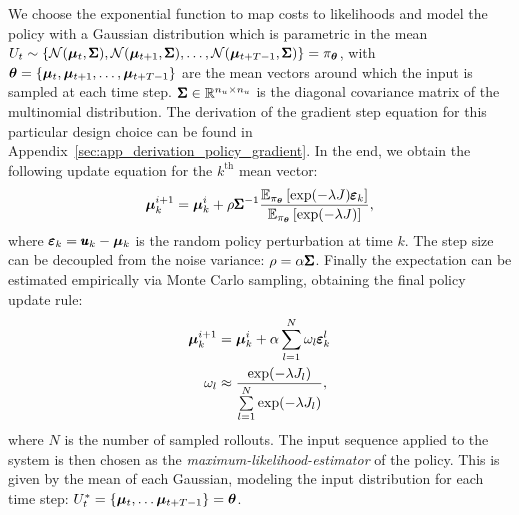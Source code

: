 We choose the exponential function to map costs to likelihoods and model the policy with a Gaussian distribution which is parametric in the mean $U_t \sim \{\mathcal{N}(\boldsymbol{\mu}_t, \pmb{\Sigma}), \mathcal{N}(\boldsymbol{\mu}_{t+1}, \pmb{\Sigma}), \dots, \mathcal{N}(\boldsymbol{\mu}_{t+T-1}, \pmb{\Sigma})\} = \pi_{\boldsymbol{\theta}}$, with $\boldsymbol{\theta} =  \{\boldsymbol{\mu}_t, \boldsymbol{\mu}_{t+1}, \dots, \boldsymbol{\mu}_{t+T-1}\}$ are the mean vectors around which the input is sampled at each time step. $\pmb{\Sigma} \in \mathbb{R}^{n_u \times n_u}$ is the diagonal covariance matrix of the multinomial distribution. The derivation of the gradient step equation for this particular design choice can be found in Appendix~\ref{sec:app_derivation_policy_gradient}. In the end, we obtain the following update equation for the $k^{\text{th}}$ mean vector:
\begin{equation}
    \boldsymbol{\mu}^{i+1}_{k} = \boldsymbol{\mu}^{i}_{k} +  \rho \pmb{\Sigma}^{-1} \frac{\mathbb{E}_{\pi_{\boldsymbol{\theta}}} \left [\exp( -\lambda J) \pmb{\varepsilon}_k \right]}{\mathbb{E}_{\pi_{\boldsymbol{\theta}}} \left [\exp( -\lambda J)\right]}  \label{eq:alpha_assumption},
\end{equation}
where $\pmb{\varepsilon}_k = \pmb{u}_k - \boldsymbol{\mu}_k$ is the random policy perturbation at time $k$.
The step size can be decoupled from the noise variance: $\rho = \alpha \pmb{\Sigma} $. Finally the expectation can be estimated empirically via Monte Carlo sampling, obtaining the final policy update rule:
\begin{align} \label{eq:update_rule}
  \boldsymbol{\mu}^{i+1}_{k} &= \boldsymbol{\mu}^{i}_{k} + \alpha  \sum \limits_{l=1}^{N}  \omega_l \pmb{\varepsilon}_{k}^{l} \\
  \omega_l  &\approx \frac{\exp ( -\lambda J_l )}{\sum \limits_{l=1}^{N} \exp ( -\lambda J_l)}, \label{eq:weighting}
\end{align}
where $N$ is the number of sampled rollouts. 
The input sequence applied to the system is then chosen as the \emph{maximum-likelihood-estimator} of the policy. This is given by the mean of each Gaussian, modeling the input distribution for each time step: $U^*_t = \{\boldsymbol{\mu}_t, \dots \boldsymbol{\mu}_{t+T-1}\} = \boldsymbol{\theta}$.

